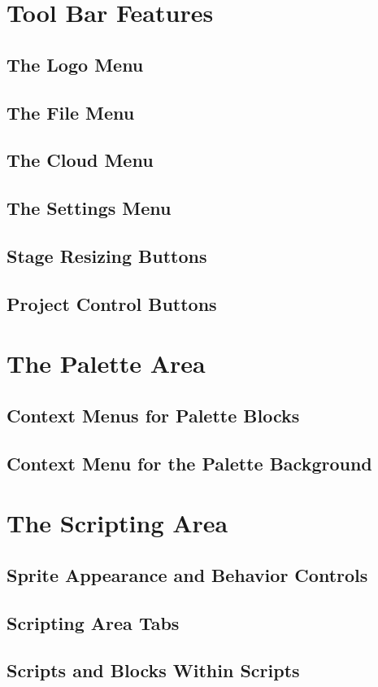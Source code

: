\documentclass{report}
\begin{document}
\section{Tool Bar Features}
\subsection{The \Snap{} Logo Menu}
\subsection{The File Menu}
\subsection{The Cloud Menu}
\subsection{The Settings Menu}
\subsection{Stage Resizing Buttons}
\subsection{Project Control Buttons}
\section{The Palette Area}
\subsection{Context Menus for Palette Blocks}
\subsection{Context Menu for the Palette Background}
\section{The Scripting Area}
\subsection{Sprite Appearance and Behavior Controls}
\subsection{Scripting Area Tabs}
\subsection{Scripts and Blocks Within Scripts}
\end{document}
